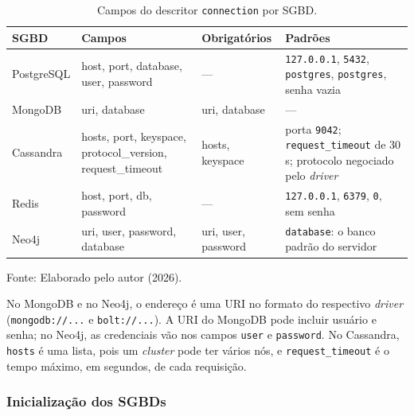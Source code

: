 \begin{table}[htbp]
  \caption{Campos do descritor \texttt{connection} por SGBD.}
  \label{tab:conexao-sgbd}
  \centering
  \setlength{\tabcolsep}{4pt}
  \begin{tabular}{l >{\raggedright\arraybackslash\ttfamily}p{4.4cm} >{\raggedright\arraybackslash\ttfamily}p{2.8cm} >{\raggedright\arraybackslash}p{4.8cm}}
    \toprule
    \textbf{SGBD} & \normalfont\textbf{Campos} & \normalfont\textbf{Obrigatórios} & \textbf{Padrões} \\
    \midrule
    PostgreSQL & host, port, database, user, password & \normalfont --- & \texttt{127.0.0.1}, \texttt{5432}, \texttt{postgres}, \texttt{postgres}, senha vazia \\
    MongoDB & uri, database & uri, database & --- \\
    Cassandra & hosts, port, keyspace, protocol\_version, request\_timeout & hosts, keyspace & porta \texttt{9042}; \texttt{request\_timeout} de 30 s; protocolo negociado pelo \textit{driver} \\
    Redis & host, port, db, password & \normalfont --- & \texttt{127.0.0.1}, \texttt{6379}, \texttt{0}, sem senha \\
    Neo4j & uri, user, password, database & uri, user, password & \texttt{database}: o banco padrão do servidor \\
    \bottomrule
  \end{tabular}
  \par\vspace{4pt}
  {\footnotesize Fonte: Elaborado pelo autor (2026).}
\end{table}

No MongoDB e no Neo4j, o endereço é uma URI no formato do respectivo \textit{driver}
(\texttt{mongodb://...} e \texttt{bolt://...}). A URI do MongoDB pode incluir usuário e
senha; no Neo4j, as credenciais vão nos campos \texttt{user} e \texttt{password}. No
Cassandra, \texttt{hosts} é uma lista, pois um \textit{cluster} pode ter vários nós, e
\texttt{request\_timeout} é o tempo máximo, em segundos, de cada requisição.

\subsubsection{Inicialização dos SGBDs}
\label{sec:inicializacao-sgbds}

